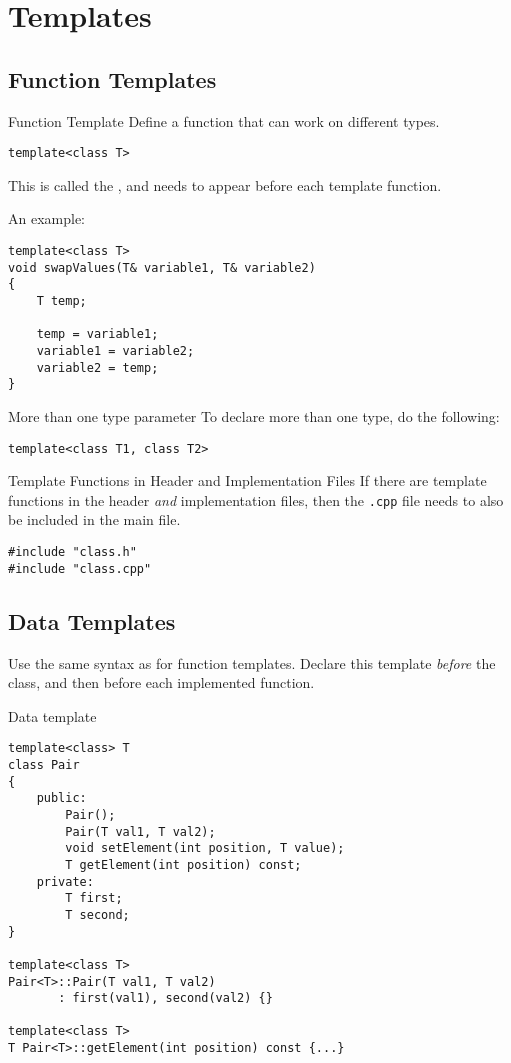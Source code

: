 \documentclass[\main/notes.tex]{subfiles}
\begin{document}
	\setcounter{chapter}{9}
	\chapter{Templates}
		\section{Function Templates}
			\begin{definition}{Function Template}
				Define a function that can work on different types.
				\begin{verbatim}
template<class T>
				\end{verbatim}
				This is called the , and needs to appear before each template function.
				\vspace{10px}

				\noindent An example:
				\begin{verbatim}
template<class T>
void swapValues(T& variable1, T& variable2)
{
    T temp;

    temp = variable1;
    variable1 = variable2;
    variable2 = temp;
}
				\end{verbatim}
			\end{definition}
			\begin{sidenote}{More than one type parameter}
				To declare more than one type, do the following:
				\begin{verbatim}
template<class T1, class T2>
				\end{verbatim}
			\end{sidenote}
			\begin{sidenote}{Template Functions in Header and Implementation Files}
If there are template functions in the header \emph{and} implementation files, then the \texttt{.cpp} file needs to also be included in the main file.
				\begin{verbatim}
#include "class.h"
#include "class.cpp"
				\end{verbatim}
			\end{sidenote}

		\section{Data Templates}
			Use the same syntax as for function templates. Declare this template \emph{before} the class, and then before each implemented function.
			\begin{codebox}{Data template}
				\begin{verbatim}
template<class> T
class Pair
{
    public:
        Pair();
        Pair(T val1, T val2);
        void setElement(int position, T value);
        T getElement(int position) const;
    private:
        T first;
        T second;
}

template<class T>
Pair<T>::Pair(T val1, T val2)
       : first(val1), second(val2) {}

template<class T>
T Pair<T>::getElement(int position) const {...}
				\end{verbatim}


			\end{codebox}

\end{document}
